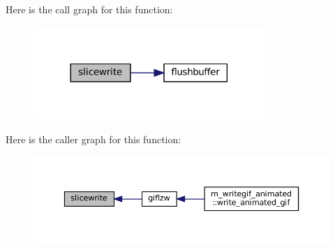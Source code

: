 Here is the call graph for this function\+:\nopagebreak
\begin{figure}[H]
\begin{center}
\leavevmode
\includegraphics[width=248pt]{M__writegif__animated_8f90_ac5c0245eea61f109cbf3ce5bbf38981b_cgraph}
\end{center}
\end{figure}
Here is the caller graph for this function\+:\nopagebreak
\begin{figure}[H]
\begin{center}
\leavevmode
\includegraphics[width=350pt]{M__writegif__animated_8f90_ac5c0245eea61f109cbf3ce5bbf38981b_icgraph}
\end{center}
\end{figure}
